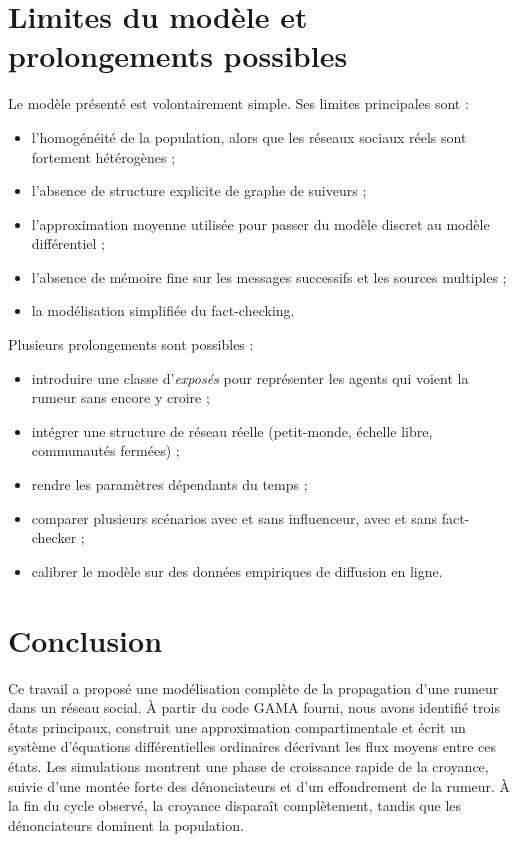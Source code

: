 \documentclass[11pt,a4paper]{article}
\begin{document}
\section{Limites du modèle et prolongements possibles}

Le modèle présenté est volontairement simple. Ses limites principales sont :

\begin{itemize}
  \item l'homogénéité de la population, alors que les réseaux sociaux réels sont fortement hétérogènes ;
  \item l'absence de structure explicite de graphe de suiveurs ;
  \item l'approximation moyenne utilisée pour passer du modèle discret au modèle différentiel ;
  \item l'absence de mémoire fine sur les messages successifs et les sources multiples ;
  \item la modélisation simplifiée du fact-checking.
\end{itemize}

Plusieurs prolongements sont possibles :

\begin{itemize}
  \item introduire une classe d'\emph{exposés} pour représenter les agents qui voient la rumeur sans encore y croire ;
  \item intégrer une structure de réseau réelle (petit-monde, échelle libre, communautés fermées) ;
  \item rendre les paramètres dépendants du temps ;
  \item comparer plusieurs scénarios avec et sans influenceur, avec et sans fact-checker ;
  \item calibrer le modèle sur des données empiriques de diffusion en ligne.
\end{itemize}

\section{Conclusion}

Ce travail a proposé une modélisation complète de la propagation d'une rumeur dans un réseau social. À partir du code GAMA fourni, nous avons identifié trois états principaux, construit une approximation compartimentale et écrit un système d'équations différentielles ordinaires décrivant les flux moyens entre ces états. Les simulations montrent une phase de croissance rapide de la croyance, suivie d'une montée forte des dénonciateurs et d'un effondrement de la rumeur. À la fin du cycle observé, la croyance disparaît complètement, tandis que les dénonciateurs dominent la population.
\end{document}
